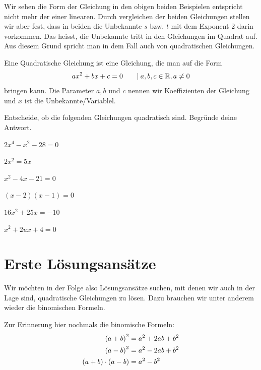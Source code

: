 \documentclass[11pt,oneside]{article}
\begin{document}
	Wir sehen die Form der Gleichung in den obigen beiden Beispielen entspricht nicht mehr der einer linearen. Durch vergleichen der beiden Gleichungen stellen wir aber fest, dass in beiden die Unbekannte $s$ bzw. $t$ mit dem Exponent $2$ darin vorkommen. Das heisst, die Unbekannte tritt in den Gleichungen im Quadrat auf. Aus diesem Grund spricht man in dem Fall auch von quadratischen Gleichungen.
	\begin{definition}
		Eine Quadratische Gleichung ist eine Gleichung, die man auf die Form \[ax^2+bx+c=0\qquad\vert\:a,b,c\in\mathbb{R},a\neq0\] bringen kann. Die Parameter $a, b$ und $c$ nennen wir Koeffizienten der Gleichung und $x$ ist die Unbekannte/Variablel.
	\end{definition}
	\begin{aufgabe}
		Entscheide, ob die folgenden Gleichungen quadratisch sind. Begründe deine Antwort.
		\begin{enumcols}[3]
			\item $2x^4-x^2-28=0$
			\item $2x^2=5x$
			\item $x^2-4x-21=0$
			\item $(x-2)(x-1)=0$
			\item $16x^2+25x=-10$
			\item $x^2+2ux+4=0$
		\end{enumcols}
	\end{aufgabe}
	\newpage

\section{Erste Lösungsansätze}
	Wir möchten in der Folge also Lösungsansätze suchen, mit denen wir auch in der Lage sind, quadratische Gleichungen zu lösen. Dazu brauchen wir unter anderem wieder die binomischen Formeln.
	\begin{framed}
		Zur Erinnerung hier nochmals die binomische Formeln:
		\begin{align*}
			\left(a+b\right)^2&=a^2+2ab+b^2\\
			\left(a-b\right)^2&=a^2-2ab+b^2\\
			\left(a+b\right)\cdot\left(a-b\right)&=a^2-b^2
		\end{align*}
	\end{framed}
\end{document}

